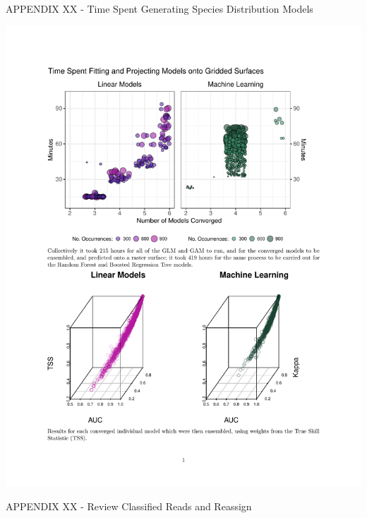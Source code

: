\documentclass[
]{article}
\begin{document}
\newpage

APPENDIX XX - Time Spent Generating Species Distribution Models

\includegraphics{../graphics/assorted/individual_model_runs.pdf}

\newpage

APPENDIX XX - Review Classified Reads and Reassign
\end{document}
